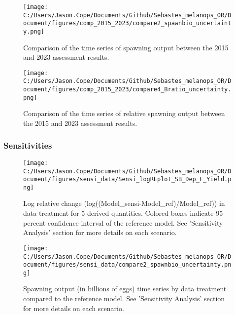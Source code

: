 \documentclass[11pt,
  letterpaper,
]{article}
\begin{document}
\begin{figure}
{\centering
\texttt{[image: C:/Users/Jason.Cope/Documents/Github/Sebastes\_melanops\_OR/Document/figures/comp\_2015\_2023/compare2\_spawnbio\_uncertainty.png]}
}
\caption{Comparison of the time series of spawning output between the 2015 and 2023 assessment results.\label{fig:comp-ssb}}
\end{figure}

\newpage

\begin{figure}
{\centering
\texttt{[image: C:/Users/Jason.Cope/Documents/Github/Sebastes\_melanops\_OR/Document/figures/comp\_2015\_2023/compare4\_Bratio\_uncertainty.png]}
}
\caption{Comparison of the time series of relative spawning output between the 2015 and 2023 assessment results.\label{fig:comp-depl}}
\end{figure}

\hypertarget{sensitivities}{%
\subsubsection{Sensitivities}\label{sensitivities}}

\begin{figure}
{\centering
\texttt{[image: C:/Users/Jason.Cope/Documents/Github/Sebastes\_melanops\_OR/Document/figures/sensi\_data/Sensi\_logREplot\_SB\_Dep\_F\_Yield.png]}
}
\caption{Log relative change (log((Model\_sensi-Model\_ref)/Model\_ref)) in data treatment for 5 derived quantities. Colored boxes indicate 95 percent confidence interval of the reference model. See 'Sensitivity Analysis' section for more details on each scenario.\label{fig:sensi-data-RE}}
\end{figure}

\newpage

\begin{figure}
{\centering
\texttt{[image: C:/Users/Jason.Cope/Documents/Github/Sebastes\_melanops\_OR/Document/figures/sensi\_data/compare2\_spawnbio\_uncertainty.png]}
}
\caption{Spawning output (in billions of eggs) time series by data treatment compared to the reference model. See 'Sensitivity Analysis' section for more details on each scenario.\label{fig:sensi-data-ssb}}
\end{figure}
\end{document}
